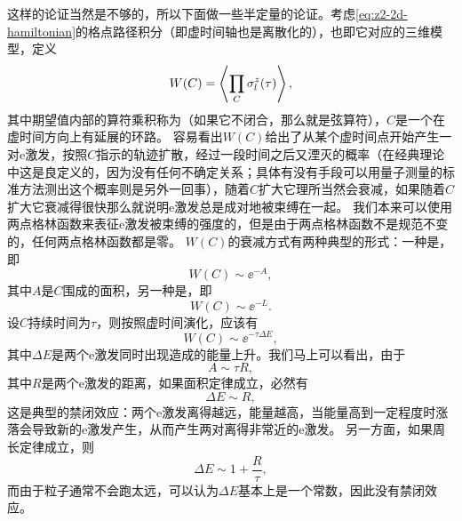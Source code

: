 这样的论证当然是不够的，所以下面做一些半定量的论证。考虑\eqref{eq:z2-2d-hamiltonian}的格点路径积分（即虚时间轴也是离散化的），也即它对应的三维模型，定义
\begin{equation}
    W(C) = \expval{\prod_C \sigma^z_l(\tau)},
\end{equation}
其中期望值内部的算符乘积称为（如果它不闭合，那么就是弦算符），$C$是一个在虚时间方向上有延展的环路。
容易看出$W(C)$给出了从某个虚时间点开始产生一对e激发，按照$C$指示的轨迹扩散，经过一段时间之后又湮灭的概率（在经典理论中这是良定义的，因为没有任何不确定关系；具体有没有手段可以用量子测量的标准方法测出这个概率则是另外一回事），随着$C$扩大它理所当然会衰减，如果随着$C$扩大它衰减得很快那么就说明e激发总是成对地被束缚在一起。
我们本来可以使用两点格林函数来表征e激发被束缚的强度的，但是由于两点格林函数不是规范不变的，任何两点格林函数都是零。
$W(C)$的衰减方式有两种典型的形式：一种是，即
\begin{equation}
    W(C) \sim \ee^{-A},
\end{equation}
其中$A$是$C$围成的面积，另一种是，即
\begin{equation}
    W(C) \sim \ee^{-L}.
\end{equation}
设$C$持续时间为$\tau$，则按照虚时间演化，应该有
\[
    W(C) \sim \ee^{-\tau \Delta E},
\]
其中$\Delta E$是两个e激发同时出现造成的能量上升。我们马上可以看出，由于
\[
    A \sim \tau R,
\]
其中$R$是两个e激发的距离，如果面积定律成立，必然有
\[
    \Delta E \sim R,
\]
这是典型的禁闭效应：两个e激发离得越远，能量越高，当能量高到一定程度时涨落会导致新的e激发产生，从而产生两对离得非常近的e激发。
另一方面，如果周长定律成立，则
\[
    \Delta E \sim 1 + \frac{R}{\tau},
\]
而由于粒子通常不会跑太远，可以认为$\Delta E$基本上是一个常数，因此没有禁闭效应。

